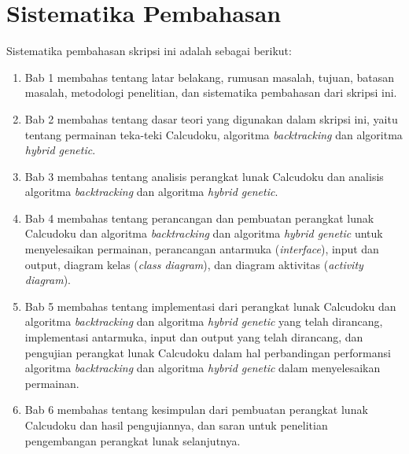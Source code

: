\section{Sistematika Pembahasan}
\label{sec:sistematikapembahasan}
Sistematika pembahasan skripsi ini adalah sebagai berikut:
\begin{enumerate}
\item Bab 1 membahas tentang latar belakang, rumusan masalah, tujuan, batasan masalah, metodologi penelitian, dan sistematika pembahasan dari skripsi ini.
\item Bab 2 membahas tentang dasar teori yang digunakan dalam skripsi ini, yaitu tentang permainan teka-teki Calcudoku, algoritma \textit{backtracking} dan algoritma \textit{hybrid genetic}.
\item Bab 3 membahas tentang analisis perangkat lunak Calcudoku dan analisis algoritma \textit{backtracking} dan algoritma \textit{hybrid genetic}.
\item Bab 4 membahas tentang perancangan dan pembuatan perangkat lunak Calcudoku dan algoritma \textit{backtracking} dan algoritma \textit{hybrid genetic} untuk menyelesaikan permainan, perancangan antarmuka (\textit{interface}), input dan output, diagram kelas (\textit{class diagram}), dan diagram aktivitas (\textit{activity diagram}).
\item Bab 5 membahas tentang implementasi dari perangkat lunak Calcudoku dan algoritma \textit{backtracking} dan algoritma \textit{hybrid genetic} yang telah dirancang, implementasi antarmuka, input dan output yang telah dirancang, dan pengujian perangkat lunak Calcudoku dalam hal perbandingan performansi algoritma \textit{backtracking} dan algoritma \textit{hybrid genetic} dalam menyelesaikan permainan.
\item Bab 6 membahas tentang kesimpulan dari pembuatan perangkat lunak Calcudoku dan hasil pengujiannya, dan saran untuk penelitian pengembangan perangkat lunak selanjutnya.
\end{enumerate}

